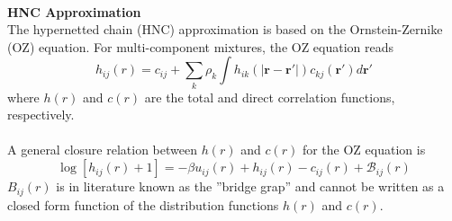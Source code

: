 \documentclass[a0paper,portrait]{baposter}
\begin{document}
\begin{poster}
{
\begin{center}
\noindent{}
\end{center}
\\
\textbf{HNC Approximation}
\\
The hypernetted chain (HNC) approximation is based on the Ornstein-Zernike (OZ) equation.
For multi-component mixtures, the OZ equation reads $$h_{ij}(r)=c_{ij}+\sum_{k}\rho_{k}\int h_{ik}(|\boldsymbol{r}-\boldsymbol{r}'|)c_{kj}(\boldsymbol{r}')d\boldsymbol{r}'$$ where $h(r)$ and $c(r)$ are the total and direct correlation functions, respectively. \\
\\
A general closure relation between $h(r)$ and $c(r)$ for the OZ
equation is $$\log\left[h_{ij}(r)+1\right]=-\beta u_{ij}(r)+h_{ij}(r)-c_{ij}(r)+\mathcal{B}_{ij}(r)$$ 
$B_{ij}(r)$ is in literature known as the ''bridge grap'' and cannot be written as a closed form function of the distribution functions $h(r)$ and $c(r)$.
\begin{center}
\noindent{}
\end{center}}
\end{poster}
\end{document}
